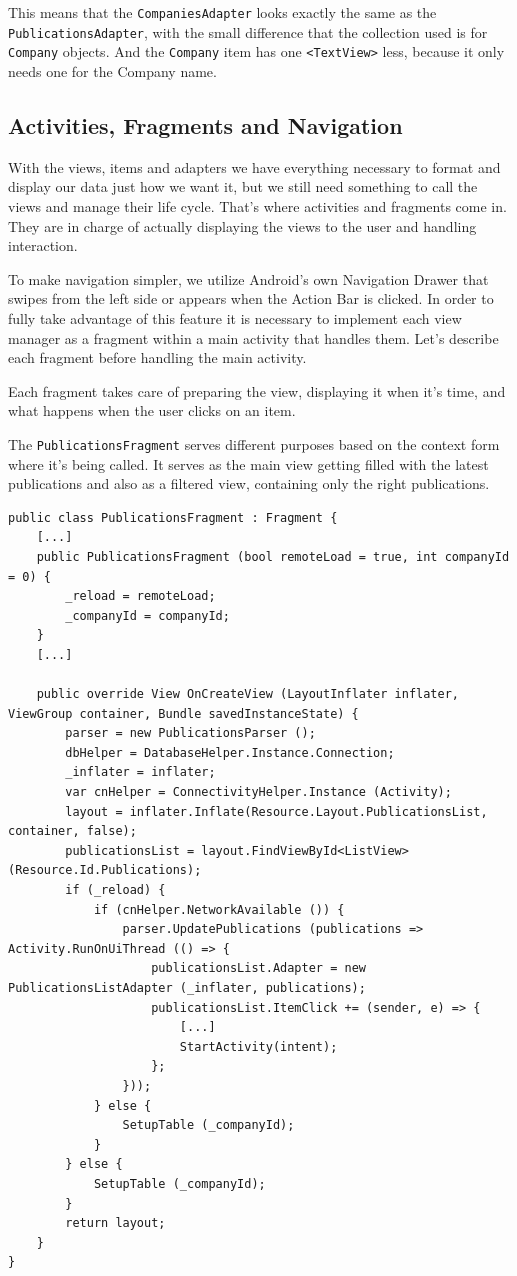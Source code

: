 This means that the \texttt{CompaniesAdapter} looks exactly the same as the \texttt{PublicationsAdapter}, with the small difference that the collection used is for \texttt{Company} objects. And the \texttt{Company} item has one \texttt{<TextView>} less, because it only needs one for the Company name.
\vfill

\subsection{Activities, Fragments and Navigation}

With the views, items and adapters we have everything necessary to format and display our data just how we want it, but we still need something to call the views and manage their life cycle. That's where activities and fragments come in. They are in charge of actually displaying the views to the user and handling interaction.

To make navigation simpler, we utilize Android's own Navigation Drawer that swipes from the left side or appears when the Action Bar is clicked. In order to fully take advantage of this feature it is necessary to implement each view manager as a fragment within a main activity that handles them. Let's describe each fragment before handling the main activity.

Each fragment takes care of preparing the view, displaying it when it's time, and what happens when the user clicks on an item. 

The \texttt{PublicationsFragment} serves different purposes based on the context form where it's being called. It serves as the main view getting filled with the latest publications and also as a filtered view, containing only the right publications.

\lstset{language=[Sharp]C}

\begin{lstlisting}[frame=lt,caption=PublicationsFragment.cs, label={list:pub_frag}]
public class PublicationsFragment : Fragment {
	[...]
	public PublicationsFragment (bool remoteLoad = true, int companyId = 0) {
		_reload = remoteLoad;
		_companyId = companyId;		
	}
	[...]
	
	public override View OnCreateView (LayoutInflater inflater, ViewGroup container, Bundle savedInstanceState) {
		parser = new PublicationsParser ();
		dbHelper = DatabaseHelper.Instance.Connection;
		_inflater = inflater;
		var cnHelper = ConnectivityHelper.Instance (Activity);
		layout = inflater.Inflate(Resource.Layout.PublicationsList, container, false);
		publicationsList = layout.FindViewById<ListView> (Resource.Id.Publications);
		if (_reload) {
			if (cnHelper.NetworkAvailable ()) {
				parser.UpdatePublications (publications => Activity.RunOnUiThread (() => {
					publicationsList.Adapter = new PublicationsListAdapter (_inflater, publications);
					publicationsList.ItemClick += (sender, e) => {
						[...]
						StartActivity(intent);
					};
				}));
			} else {
				SetupTable (_companyId);
			}		
		} else {
			SetupTable (_companyId);	
		}
		return layout;
	}
}
\end{lstlisting}

